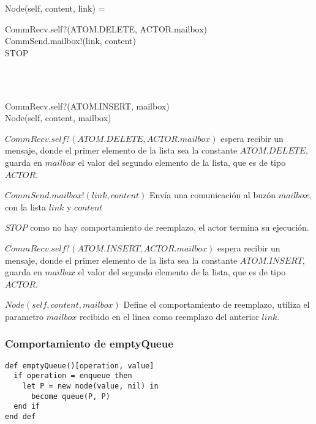 \begin{process}
Node(self, content, link) = \\ \quad
  \begin{block}
  CommRecv.self?(ATOM.DELETE, ACTOR.mailbox) \then \\
  CommSend.mailbox!(link, content) \then \\
  STOP
  \end{block} \\

  \Extchoice \\ \quad
  
  \begin{block}
  CommRecv.self?(ATOM.INSERT, mailbox) \then \\
  Node(self, content, mailbox)
  \end{block}
\end{process}

\begin{description}
 \item $CommRecv.self?(ATOM.DELETE, ACTOR.mailbox)$ espera recibir un mensaje, donde el primer elemento de la lista sea la constante $ATOM.DELETE$, guarda en $mailbox$ el valor del segundo elemento de la lista, que es de tipo $ACTOR$.
 \item $CommSend.mailbox!(link, content)$ Envía una comunicación al buzón $mailbox$, con la lista $link$ y $content$
 \item $STOP$ como no hay comportamiento de reemplazo, el actor termina su ejecución.
 \item $CommRecv.self?(ATOM.INSERT, ACTOR.mailbox)$ espera recibir un mensaje, donde el primer elemento de la lista sea la constante $ATOM.INSERT$, guarda en $mailbox$ el valor del segundo elemento de la lista, que es de tipo $ACTOR$.
 \item $Node(self, content, mailbox)$ Define el comportamiento de reemplazo, utiliza el parametro $mailbox$ recibido en el linea como reemplazo del anterior $link$.
\end{description}

\subsubsection*{Comportamiento de emptyQueue}

\begin{lstlisting}[language=sal, style=simple]
def emptyQueue()[operation, value]
  if operation = enqueue then
    let P = new node(value, nil) in
      become queue(P, P)
  end if
end def
\end{lstlisting}

